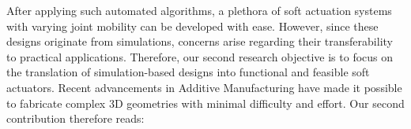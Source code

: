  After applying such automated algorithms, a plethora of soft actuation systems with varying joint mobility can be developed with ease. However, since these designs originate from simulations, concerns arise regarding their transferability to practical applications. Therefore, our second research objective is to focus on the translation of simulation-based designs into functional and feasible soft actuators. Recent advancements in Additive Manufacturing have made it possible to fabricate complex 3D geometries with minimal difficulty and effort. Our second contribution therefore reads:


